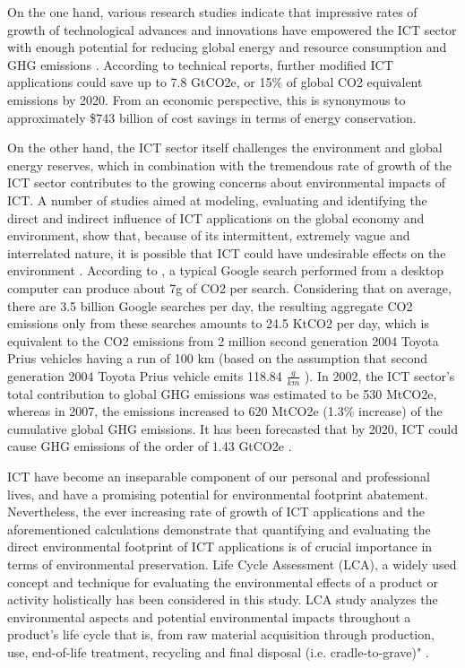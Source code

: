 \documentclass[conference]{IEEEtran}
\begin{document}
On the one hand, various research studies indicate that impressive rates of growth of technological advances and innovations have empowered the ICT sector with enough potential for reducing global energy and resource consumption and GHG emissions  \cite{10046363,924525, 6360455}. According to \cite{3758490, 7282419} technical reports, further modified ICT applications could save up to 7.8 GtCO2e, or 15\% of global CO2 equivalent emissions by 2020. From an economic perspective, this is synonymous to approximately \$743 billion of cost savings in terms of energy conservation.

On the other hand, the ICT sector itself challenges the environment and global energy reserves, which in combination with the tremendous rate of growth of the ICT sector contributes to the growing concerns about environmental impacts of ICT. A number of studies aimed at modeling, evaluating and identifying the direct and indirect influence of ICT applications on the global economy and environment, show that, because of its intermittent, extremely vague and interrelated nature, it is possible that ICT could have undesirable effects on the environment  \cite{Hilty20061618, 6083606, Bull201410}. According to \cite{7282419}, a typical Google search performed from a desktop computer can produce about 7g of CO2 per search. Considering that on average, there are 3.5 billion Google searches per day, the resulting aggregate CO2 emissions only from these searches amounts to 24.5 KtCO2 per day, which is equivalent to the CO2 emissions from 2 million second generation 2004 Toyota Prius vehicles having a run of 100 km (based on the assumption that second generation 2004 Toyota Prius vehicle emits 118.84 $\frac{g}{km}$ \cite{6728838}). In 2002, the ICT sector's total contribution to global GHG emissions was estimated to be 530 MtCO2e, whereas in 2007, the emissions increased to 620 MtCO2e (1.3\% increase) of the cumulative global GHG emissions. It has been forecasted that by 2020, ICT could cause GHG emissions of the order of 1.43 GtCO2e  \cite{malmodin2013future, 3758490}.

ICT have become an inseparable component of our personal and professional lives, and have a promising potential for environmental footprint abatement. Nevertheless, the ever increasing rate of growth of ICT applications and the aforementioned calculations demonstrate that quantifying and evaluating the direct environmental footprint of ICT applications is of crucial importance in terms of environmental preservation. Life Cycle Assessment (LCA), a widely used concept and technique for evaluating the environmental effects of a product or activity holistically has been considered in this study. LCA study analyzes the environmental aspects and potential environmental impacts throughout a product's life cycle that is, from raw material acquisition through production, use, end-of-life treatment, recycling and final disposal (i.e. cradle-to-grave)" \cite{ISO140402006}.
\end{document}
